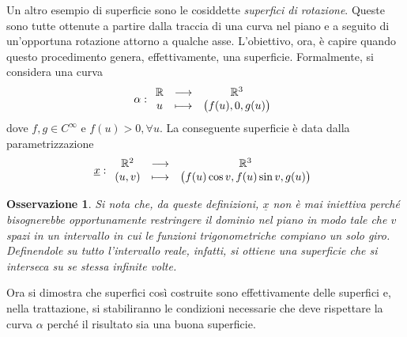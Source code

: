 \documentclass[12pt]{scrartcl}
\theoremstyle{style}
\newtheorem{osservazione}{Osservazione}[section]
\numberwithin{equation}{subsection}
\begin{document}
Un altro esempio di superficie sono le cosiddette \textit{superfici di rotazione}.
Queste sono tutte ottenute a partire dalla traccia di una curva nel piano e a seguito di un'opportuna rotazione attorno a qualche asse.
L'obiettivo, ora, \`e capire quando questo procedimento genera, effettivamente, una superficie.
Formalmente, si considera una curva 
\[
\alpha : 
\begin{array}
	{c c c}
	\mathbb{R} & \longrightarrow & \mathbb{R}^3\\
	u&\longmapsto & \big(f(u) , 0 , g(u)\big)
\end{array}
\] 
dove $f,g \in C^\infty$ e $f(u) > 0,  \forall u$.
La conseguente superficie \`e data dalla parametrizzazione
\[
\underline{x}:
\begin{array}
	{c c c}
	\mathbb{R}^2 & \longrightarrow & \mathbb{R}^3\\
	(u,v) &\longmapsto & \big(f(u) \cos v, f(u) \sin v , g(u)\big)
\end{array}
\] 
\begin{osservazione}
Si nota che, da queste definizioni, $\underline{x}$ non \`e mai iniettiva perch\'e bisognerebbe opportunamente restringere il dominio nel piano in modo tale che $v$ spazi in un intervallo in cui le funzioni trigonometriche compiano un solo giro.
Definendole su tutto l'intervallo reale, infatti, si ottiene una superficie che si interseca su se stessa infinite volte.
\end{osservazione}
\noindent Ora si dimostra che superfici cos\`i costruite sono effettivamente delle superfici e, nella trattazione, si stabiliranno le condizioni necessarie che deve rispettare la curva $\alpha $ perch\'e il risultato sia una buona superficie.
\end{document}
